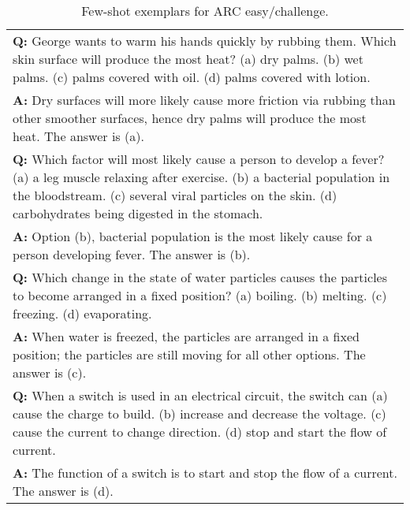 \begin{table}[h]
    \caption{
    Few-shot exemplars for ARC easy/challenge.
    }
    \centering
    \small
    \begin{tabular}{p{13.5cm}}
        \toprule
        \textbf{Q:} George wants to warm his hands quickly by rubbing them. Which skin surface will produce the most heat? (a) dry palms. (b) wet palms. (c) palms covered with oil. (d) palms covered with lotion.\\
        \vspace{-1mm}
        \textbf{A:} Dry surfaces will more likely cause more friction via rubbing than other smoother surfaces, hence dry palms will produce the most heat. The answer is (a).\\
        \vspace{0mm}
        \textbf{Q:} Which factor will most likely cause a person to develop a fever? (a) a leg muscle relaxing after exercise. (b) a bacterial population in the bloodstream. (c) several viral particles on the skin. (d) carbohydrates being digested in the stomach.\\
        \vspace{-1mm}
        \textbf{A:} Option (b), bacterial population is the most likely cause for a person developing fever. The answer is (b). \\
        \vspace{0mm}
        \textbf{Q:} Which change in the state of water particles causes the particles to become arranged in a fixed position? (a) boiling. (b) melting. (c) freezing. (d) evaporating.\\
        \vspace{-1mm}
        \textbf{A:} When water is freezed, the particles are arranged in a fixed position; the particles are still moving for all other options. The answer is (c).\\
        \vspace{0mm}
        \textbf{Q:} When a switch is used in an electrical circuit, the switch can (a) cause the charge to build. (b) increase and decrease the voltage. (c) cause the current to change direction. (d) stop and start the flow of current.\\
        \vspace{-1mm}
        \textbf{A:} The function of a switch is to start and stop the flow of a current. The answer is (d).\\
        \bottomrule
    \end{tabular}
    \label{tab:prompt-arc}
\end{table}

